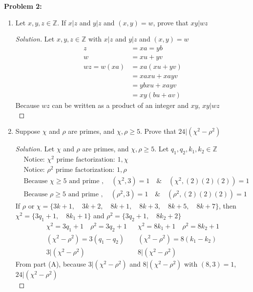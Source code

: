 \documentclass[12pt]{article}
\begin{document}
\newpage 
\noindent \textbf{Problem 2: }
	\begin{enumerate}[label = (\alph*)]
		\item Let $x,y,z \in \mathbb{Z}$. If $x|z$ and $y|z$ and $(x,y) = w$, prove that $xy|wz$
		\begin{proof}[Solution]
			Let $x,y,z \in \mathbb{Z}$ with $x|z$ and $y|z$ and $(x,y) = w$
			\begin{align*}
				z &= xa = yb \\
				w &= xu + yv \\
				wz = w(xa) &= xa(xu + yv) \\
				&= xaxu + xayv \\
				&= ybxu + xayv \\
				&= xy(bu + av)
			\end{align*}
			Because $wz$ can be written as a product of an integer and $xy$, $xy|wz$ \\  
		\end{proof}
		\item Suppose $\chi$ and $\rho$ are primes, and $\chi, \rho \geq 5$. Prove that $24|(\chi^2 - \rho^2)$ 
		\begin{proof}[Solution]
			Let $\chi$ and $\rho$ are primes, and $\chi, \rho \geq 5$. Let $q_1,q_2,k_1,k_2 \in \mathbb{Z}$
			\begin{align*}
				&\text{Notice: } \chi^2 \text{ prime factorization: } 1, \chi \\
				&\text{Notice: } \rho^2 \text{ prime factorization: } 1, \rho \\
				&\text{Because } \chi \geq 5 \text{ and prime }, \quad (\chi^2,3) = 1  \quad \& \quad (\chi^2,(2)(2)(2)) = 1 \\
				&\text{Because } \rho \geq 5 \text{ and prime }, \quad (\rho^2,3) = 1  \quad \& \quad (\rho^2,(2)(2)(2)) = 1 
			\end{align*}
			If $\rho$ or $\chi = \{3k + 1, \quad 3k + 2,\quad 8k + 1,\quad 8k + 3,\quad 8k + 5, \quad 8k + 7\}$, then \\ $\chi^2 = \{3q_1 + 1,\quad 8k_1 + 1\}$ and $\rho^2 = \{3q_2 + 1,\quad 8k_2+2\}$
			\begin{align*}
				\chi^2 = 3q_1 + 1 \quad \rho^2 = 3q_2 + 1  &&  \chi^2 = 8k_1 + 1 \quad \rho^2 = 8k_2 + 1  \\
				(\chi^2 - \rho^2) = 3(q_1 - q_2) &&  (\chi^2 - \rho^2) = 8(k_1 - k_2) \\
				3 | (\chi^2 - \rho^2)	&&  8 | (\chi^2 - \rho^2)
			\end{align*}
			From part (A), because $3 | (\chi^2 - \rho^2)$ and $8 | (\chi^2 - \rho^2)$ with $(8,3) = 1$,  $24 | (\chi^2 - \rho^2)$ \\
		\end{proof}
	\end{enumerate}
\end{document}
